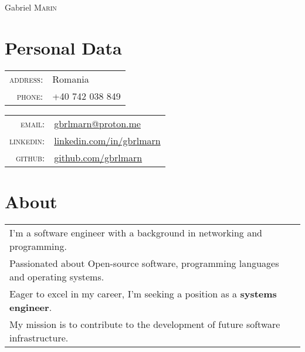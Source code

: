 \documentclass[a4paper,10pt]{article}
\begin{document}
\pagestyle{empty}

\par
  {\centering
    {\Huge Gabriel \textsc{Marin}}
    \bigskip\par
  }

\section{Personal Data}
\begin{multicols}{2}
  \begin{tabular}{rl}
    \textsc{address:}&Romania\\
    \textsc{phone:}&+40 742 038 849\\
  \end{tabular}
    \columnbreak
  \begin{tabular}{rl}
    \textsc{email:}&\href{mailto:gbrlmarn@proton.me}
      {gbrlmarn@proton.me}\\
    \textsc{linkedin:}&\href{https://linkedin.com/in/gbrlmarn}
      {linkedin.com/in/gbrlmarn}\\
    \textsc{github:}&\href{https://github.com/gbrlmarn}
      {github.com/gbrlmarn}\\
  \end{tabular}
\end{multicols}

\section{About}
\begin{tabular}{l}
I'm a software engineer with a background in networking and programming.\\
Passionated about Open-source software, programming languages and operating systems.\\
Eager to excel in my career, I'm seeking a position as a \textbf{systems engineer}.\\ 
My mission is to contribute to the development of future software infrastructure.\\
\end{tabular}

\end{document}

